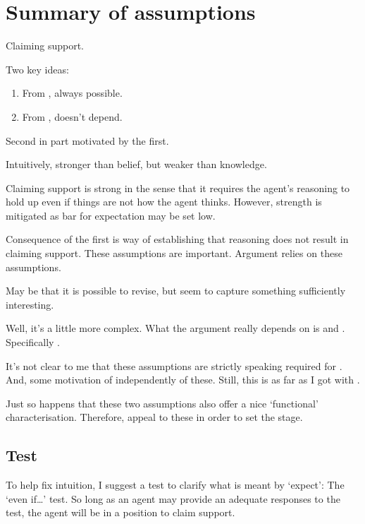\section{Summary of assumptions}

\begin{note}
  Claiming support.

  Two key ideas:

  \begin{enumerate}
  \item From \nfcs{}, always possible.
  \item From \eiS{}, doesn't depend.
  \end{enumerate}
  Second in part motivated by the first.

  Intuitively, stronger than belief, but weaker than knowledge.

  {
    \color{red}
    Claiming support is strong in the sense that it requires the agent's reasoning to hold up even if things are not how the agent thinks.
    However, strength is mitigated as bar for expectation may be set low.
  }

  Consequence of the first is way of establishing that reasoning does not result in claiming support.
  These assumptions are important.
  Argument relies on these assumptions.

  May be that it is possible to revise, but seem to capture something sufficiently interesting.
\end{note}

\begin{note}
  Well, it's a little more complex.
  What the argument really depends on is \ESU{} and \nI{}.
  Specifically \nI{}.

  It's not clear to me that these assumptions are strictly speaking required for \nI{}.
  And, some motivation of \nI{} independently of these.
  Still, this is as far as I got with \nI{}.

  Just so happens that these two assumptions also offer a nice `functional' characterisation.
  Therefore, appeal to these in order to set the stage.
\end{note}

\hozline{}

\subsection{Test}

\begin{note}
  To help fix intuition, I suggest a test to clarify what is meant by `expect': The `even if\dots' test.
  So long as an agent may provide an adequate responses to the test, the agent will be in a position to claim support.
\end{note}

